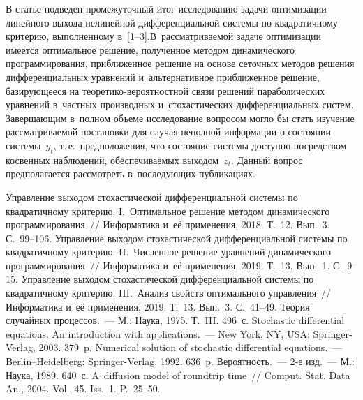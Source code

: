 \begin{multicols}{2}
\vspace*{-3pt}
     
     В статье подведен промежуточный итог исследованию задачи 
оптимизации линейного выхода нелинейной дифференциальной системы по 
квад\-ратичному критерию, выполненному в~[1--3].\linebreak В~рассматриваемой 
задаче оптимизации имеется оптимальное решение, полученное методом 
динамического программирования, приближенное решение на основе 
сеточных методов решения дифференциальных уравнений и~альтернативное\linebreak 
приближенное решение, базирующееся на тео\-ре\-ти\-ко-ве\-ро\-ят\-ност\-ной связи 
решений параболических уравнений в~частных производных 
и~стохастических дифференциальных систем. Завершающим в~полном 
объеме исследование вопросом могло бы стать изучение рассматриваемой 
постановки для случая неполной информации о состоянии системы~$y_t$, 
т.\,е.\ предположения, что состояние системы доступно посредством 
косвенных наблюдений, обеспечиваемых выходом~$z_t$. Данный вопрос 
предполагается рассмотреть в~последующих пуб\-ли\-ка\-циях.

\vspace*{-8pt}

{\small\frenchspacing
 {%
 \begin{thebibliography}{9}
 Управление выходом стохастической 
дифференциальной системы по квадратичному критерию. I.~Оптимальное решение 
методом динамического программирования~// Информатика и~её применения, 2018. 
Т.~12. Вып.~3. С.~99--106.
 Управление выходом стохастической 
дифференциальной системы по квадратичному критерию. II.~Численное решение 
уравнений динамического программирования~// Информатика и~её применения, 2019. 
Т.~13. Вып.~1. С.~9--15.
 Управление выходом стохастической 
дифференциальной системы по квадратичному критерию. III.~Анализ свойств 
оптимального управления~// Информатика и~её применения, 2019. Т.~13. Вып.~3.  
С.~41--49.
 Теория случайных процессов.~--- М.: Наука, 
1975.  Т.~III. 496~с.
 Stochastic differential equations. An introduction with  
applications.~--- New York, NY, USA: Springer-Verlag, 2003. 379~p.
 Numerical solution of stochastic differential equations.~--- 
Berlin--Heidelberg: Springer-Verlag, 1992. 636~p.
 Вероятность.~--- 2-е изд.~--- М.: Наука, 1989. 640~с.
 A~diffusion model of roundtrip time~// Comput. Stat.  
Data An., 2004. Vol.~45. Iss.~1. P.~25--50.
 \end{thebibliography}

 }
 }

\end{multicols}

